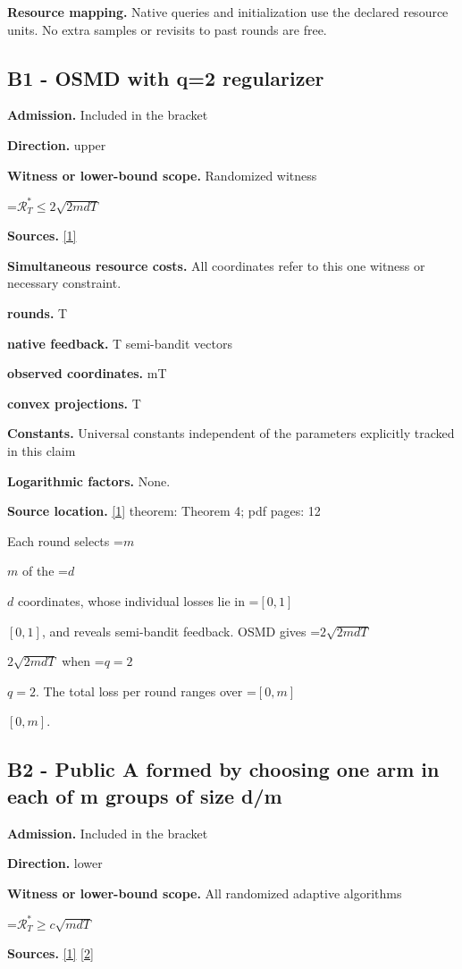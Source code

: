 \documentclass[10pt,a4paper]{article}
\newcommand{\AtlasMath}[1]{\par\begingroup\centering\setbox0=\hbox{$\displaystyle #1$}\ifdim\wd0>1.4\linewidth\typeout{ATLAS WIDE FORMULA: \the\wd0}\fi\ifdim\wd0>\linewidth\resizebox{\linewidth}{!}{\box0}\else\box0\fi\par\endgroup}
\newcommand{\AtlasInlineMath}[1]{\begingroup\setbox0=\hbox{$#1$}\ifdim\wd0>.4\linewidth\endgroup\AtlasMath{#1}\else\endgroup$#1$\fi}
\begin{document}
\textbf{Resource mapping.} Native queries and initialization use the declared resource units. No extra samples or revisits to past rounds are free.

\subsection{B1 - OSMD with q=2 regularizer}
\textbf{Admission.} Included in the bracket

\textbf{Direction.} upper

\textbf{Witness or lower-bound scope.} Randomized witness

\AtlasMath{\mathcal{R}_T^*\le2\sqrt{2mdT}}
\textbf{Sources.} \href{https://arxiv.org/pdf/1204.4710v2}{[1]}

\textbf{Simultaneous resource costs.} All coordinates refer to this one witness or necessary constraint.

\textbf{rounds.} T

\textbf{native feedback.} T semi-bandit vectors

\textbf{observed coordinates.} mT

\textbf{convex projections.} T

\textbf{Constants.} Universal constants independent of the parameters explicitly tracked in this claim

\textbf{Logarithmic factors.} None.

\textbf{Source location.} \href{https://arxiv.org/pdf/1204.4710v2}{[1]} theorem: Theorem 4; pdf pages: 12

Each round selects \AtlasInlineMath{m} of the \AtlasInlineMath{d} coordinates, whose individual losses lie in \AtlasInlineMath{[0,1]}, and reveals semi-bandit feedback. OSMD gives \AtlasInlineMath{2\sqrt{2mdT}} when \AtlasInlineMath{q=2}. The total loss per round ranges over \AtlasInlineMath{[0,m]}.

\subsection{B2 - Public A formed by choosing one arm in each of m groups of size d/m}
\textbf{Admission.} Included in the bracket

\textbf{Direction.} lower

\textbf{Witness or lower-bound scope.} All randomized adaptive algorithms

\AtlasMath{\mathcal{R}_T^*\ge c\sqrt{mdT}}
\textbf{Sources.} \href{https://arxiv.org/pdf/1204.4710v2}{[1]} \href{https://jmlr.org/papers/volume11/audibert10a/audibert10a.pdf}{[2]}
\end{document}

